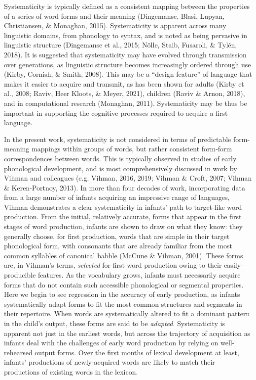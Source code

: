 \documentclass[
  man]{apa6}
\begin{document}
Systematicity is typically defined as a consistent mapping between the properties of a series of word forms and their meaning (Dingemanse, Blasi, Lupyan, Christiansen, \& Monaghan, 2015). Systematicity is apparent across many linguistic domains, from phonology to syntax, and is noted as being pervasive in linguistic structure (Dingemanse et al., 2015; Nölle, Staib, Fusaroli, \& Tylén, 2018). It is suggested that systematicity may have evolved through transmission over generations, as linguistic structure becomes increasingly ordered through use (Kirby, Cornish, \& Smith, 2008). This may be a ``design feature'' of language that makes it easier to acquire and transmit, as has been shown for adults (Kirby et al., 2008; Raviv, Heer Kloots, \& Meyer, 2021), children (Raviv \& Arnon, 2018), and in computational research (Monaghan, 2011). Systematicity may be thus be important in supporting the cognitive processes required to acquire a first language.

In the present work, systematicity is not considered in terms of predictable form-meaning mappings within groups of words, but rather consistent form-form correspondences between words. This is typically observed in studies of early phonological development, and is most comprehensively discussed in work by Vihman and colleagues (e.g. Vihman, 2016, 2019; Vihman \& Croft, 2007; Vihman \& Keren-Portnoy, 2013). In more than four decades of work, incorporating data from a large number of infants acquiring an impressive range of languages, Vihman demonstrates a clear systematicity in infants' path to target-like word production. From the initial, relatively accurate, forms that appear in the first stages of word production, infants are shown to draw on what they know: they generally choose, for first production, words that are simple in their target phonological form, with consonants that are already familiar from the most common syllables of canonical babble (McCune \& Vihman, 2001). These forms are, in Vihman's terms, \emph{selected} for first word production owing to their easily-producible features. As the vocabulary grows, infants must necessarily acquire forms that do not contain such accessible phonological or segmental properties. Here we begin to see regression in the accuracy of early production, as infants systematically adapt forms to fit the most common structures and segments in their repertoire. When words are systematically altered to fit a dominant pattern in the child's output, these forms are said to be \emph{adapted}. Systematicity is apparent not just in the earliest words, but across the trajectory of acquisition as infants deal with the challenges of early word production by relying on well-rehearsed output forms. Over the first months of lexical development at least, infants' productions of newly-acquired words are likely to match their productions of existing words in the lexicon.
\end{document}
